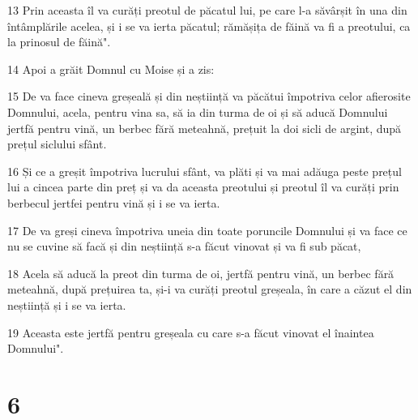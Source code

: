 \par 13 Prin aceasta îl va curăți preotul de păcatul lui, pe care l-a săvârșit în una din întâmplările acelea, și i se va ierta păcatul; rămășița de făină va fi a preotului, ca la prinosul de făină".
\par 14 Apoi a grăit Domnul cu Moise și a zis:
\par 15 De va face cineva greșeală și din neștiință va păcătui împotriva celor afierosite Domnului, acela, pentru vina sa, să ia din turma de oi și să aducă Domnului jertfă pentru vină, un berbec fără meteahnă, prețuit la doi sicli de argint, după prețul siclului sfânt.
\par 16 Și ce a greșit împotriva lucrului sfânt, va plăti și va mai adăuga peste prețul lui a cincea parte din preț și va da aceasta preotului și preotul îl va curăți prin berbecul jertfei pentru vină și i se va ierta.
\par 17 De va greși cineva împotriva uneia din toate poruncile Domnului și va face ce nu se cuvine să facă și din neștiință s-a făcut vinovat și va fi sub păcat,
\par 18 Acela să aducă la preot din turma de oi, jertfă pentru vină, un berbec fără meteahnă, după prețuirea ta, și-i va curăți preotul greșeala, în care a căzut el din neștiință și i se va ierta.
\par 19 Aceasta este jertfă pentru greșeala cu care s-a făcut vinovat el înaintea Domnului".

\chapter{6}

